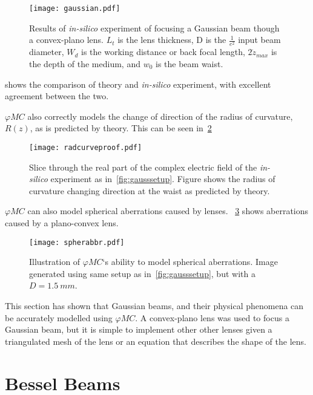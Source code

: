\begin{figure}[!htp]
    \centering
    \texttt{[image: gaussian.pdf]}
    \caption{Results of \textit{in-silico} experiment of focusing a Gaussian beam though a convex-plano lens. $L_t$ is the lens thickness, D is the $\tfrac{1}{e^2}$ input beam diameter, $W_d$ is the working distance or back focal length, $2\dot z_{max}$ is the depth of the medium, and $w_0$ is the beam waist.}
    \label{fig:simgaussexp}
\end{figure}


 shows the comparison of theory and \textit{in-silico} experiment, with excellent agreement between the two.

$\varphi MC$ also correctly models the change of direction of the radius of curvature, $R(z)$, as is predicted by theory.
This can be seen in~\cref{fig:proofchgrz}

\begin{figure}[!htp]
    \centering
    \texttt{[image: radcurveproof.pdf]}
    \caption{Slice through the real part of the complex electric field of the \textit{in-silico} experiment as in~\cref{fig:gausssetup}. Figure shows the radius of curvature changing direction at the waist as predicted by theory.}
    \label{fig:proofchgrz}
\end{figure}

$\varphi MC$ can also model spherical aberrations caused by lenses.
~\cref{fig:spheraberr} shows aberrations caused by a plano-convex lens.

\begin{figure}[!hbtp]
    \centering
    \texttt{[image: spherabbr.pdf]}
    \caption{Illustration of $\varphi MC$`s ability to model spherical aberrations. Image generated using same setup as in~\cref{fig:gausssetup}, but with a $D=1.5~mm$.}
    \label{fig:spheraberr}
\end{figure}


This section has shown that Gaussian beams, and their physical phenomena can be accurately modelled using $\varphi MC$.
A convex-plano lens was used to focus a Gaussian beam, but it is simple to implement other other lenses given a triangulated mesh of the lens or an equation that describes the shape of the lens. 
\FloatBarrier

\section{Bessel Beams}

